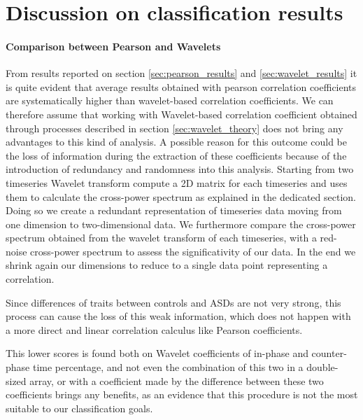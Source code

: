 \documentclass[11pt]{report}
\begin{document}
\section{Discussion on classification results}

\paragraph{Comparison between Pearson and Wavelets}
From results reported on section \ref{sec:pearson_results} and \ref{sec:wavelet_results} it is quite evident that average results obtained with pearson correlation coefficients are systematically higher than wavelet-based correlation coefficients.
We can therefore assume that working with Wavelet-based correlation coefficient obtained through processes described in section \ref{sec:wavelet_theory} does not bring any advantages to this kind of analysis.
A possible reason for this outcome could be the loss of information during the extraction of these coefficients because of the introduction of redundancy and randomness into this analysis. Starting from two timeseries Wavelet transform compute a 2D matrix for each timeseries and uses them to calculate the cross-power spectrum as explained in the dedicated section.
Doing so we create a redundant representation of timeseries data moving from one dimension to two-dimensional data.
We furthermore compare the cross-power spectrum obtained from the wavelet transform of each timeseries, with a red-noise cross-power spectrum to assess the significativity of our data.
In the end we shrink again our dimensions to reduce to a single data point representing a correlation.

Since differences of traits between controls and ASDs are not very strong, this process can cause the loss of this weak information, which does not happen with a more direct and linear correlation calculus like Pearson coefficients.

This lower scores is found both on Wavelet coefficients of in-phase and counter-phase time percentage, and not even the combination of this two in a double-sized array, or with a coefficient made by the difference between these two coefficients brings any benefits, as an evidence that this procedure is not the most suitable to our classification goals.
\end{document}
